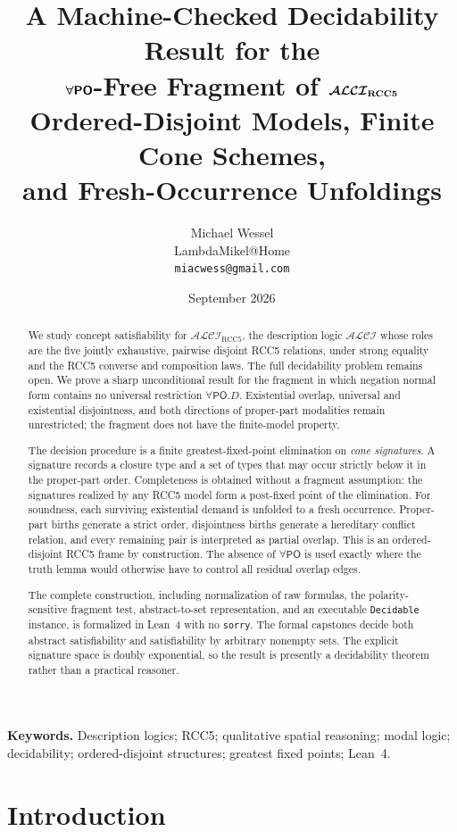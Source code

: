 \documentclass[11pt]{article}
\title{\textbf{A Machine-Checked Decidability Result for the\\
  $\boldsymbol{\forall\PO}$-Free Fragment of $\boldsymbol{\Logic}$}\\[.45em]
  \large Ordered-Disjoint Models, Finite Cone Schemes,\\
  and Fresh-Occurrence Unfoldings}
\author{Michael Wessel\\
  \small LambdaMikel@Home\\
  \small \texttt{miacwess@gmail.com}}
\date{September 2026}
\theoremstyle{plain}
\theoremstyle{definition}
\theoremstyle{remark}
\newcommand{\Logic}{\ensuremath{\mathcal{ALCI}_{\mathrm{RCC5}}}}
\newcommand{\PO}{\ensuremath{\mathsf{PO}}}
\begin{document}
\maketitle

\begin{abstract}
We study concept satisfiability for $\Logic$, the description logic
$\mathcal{ALCI}$ whose roles are the five jointly exhaustive, pairwise
disjoint RCC5 relations, under strong equality and the RCC5 converse and
composition laws.  The full decidability problem remains open.  We prove a
sharp unconditional result for the fragment in which negation normal form
contains no universal restriction $\forall\PO.D$.  Existential overlap,
universal and existential disjointness, and both directions of proper-part
modalities remain unrestricted; the fragment does not have the finite-model
property.

The decision procedure is a finite greatest-fixed-point elimination on
\emph{cone signatures}.  A signature records a closure type and a set of types
that may occur strictly below it in the proper-part order.  Completeness is
obtained without a fragment assumption: the signatures realized by any RCC5
model form a post-fixed point of the elimination.  For soundness, each
surviving existential demand is unfolded to a fresh occurrence.  Proper-part
births generate a strict order, disjointness births generate a hereditary
conflict relation, and every remaining pair is interpreted as partial overlap.
This is an ordered-disjoint RCC5 frame by construction.  The absence of
$\forall\PO$ is used exactly where the truth lemma would otherwise have to
control all residual overlap edges.

The complete construction, including normalization of raw formulas, the
polarity-sensitive fragment test, abstract-to-set representation, and an
executable \texttt{Decidable} instance, is formalized in Lean~4 with no
\texttt{sorry}.  The formal capstones decide both abstract satisfiability and
satisfiability by arbitrary nonempty sets.  The explicit signature space is
doubly exponential, so the result is presently a decidability theorem rather
than a practical reasoner.
\end{abstract}

\noindent\textbf{Keywords.}
Description logics; RCC5; qualitative spatial reasoning; modal logic;
decidability; ordered-disjoint structures; greatest fixed points; Lean~4.

\tableofcontents

\section{Introduction}
\label{sec:introduction}
\end{document}
